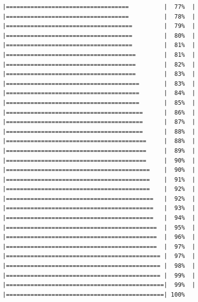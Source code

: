 \documentclass[
  krantz2]{krantz}
\begin{document}
\begin{verbatim}
|===================================          |  77%  |                                                     |===================================          |  78%  |                                                     |====================================         |  79%  |                                                     |====================================         |  80%  |                                                     |====================================         |  81%  |                                                     |=====================================        |  81%  |                                                     |=====================================        |  82%  |                                                     |=====================================        |  83%  |                                                     |======================================       |  83%  |                                                     |======================================       |  84%  |                                                     |======================================       |  85%  |                                                     |=======================================      |  86%  |                                                     |=======================================      |  87%  |                                                     |=======================================      |  88%  |                                                     |========================================     |  88%  |                                                     |========================================     |  89%  |                                                     |========================================     |  90%  |                                                     |=========================================    |  90%  |                                                     |=========================================    |  91%  |                                                     |=========================================    |  92%  |                                                     |==========================================   |  92%  |                                                     |==========================================   |  93%  |                                                     |==========================================   |  94%  |                                                     |===========================================  |  95%  |                                                     |===========================================  |  96%  |                                                     |===========================================  |  97%  |                                                     |============================================ |  97%  |                                                     |============================================ |  98%  |                                                     |============================================ |  99%  |                                                     |=============================================|  99%  |                                                     |=============================================| 100%

\end{verbatim}
\end{document}
